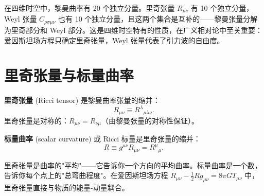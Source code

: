 \begin{remark}[$n=4$ 的特殊性]
在四维时空中，黎曼曲率有 20 个独立分量。里奇张量 $R_{\mu\nu}$ 有 10 个独立分量，Weyl 张量 $C_{\rho\sigma\mu\nu}$ 也有 10 个独立分量，且这两个集合是互补的——黎曼张量分解为里奇部分和 Weyl 部分。这是四维时空特有的性质，在广义相对论中至关重要：爱因斯坦场方程只确定里奇张量，Weyl 张量代表了引力波的自由度。
\end{remark}

\section{里奇张量与标量曲率}

\begin{definition}[里奇张量]
\textbf{里奇张量} (Ricci tensor) 是黎曼曲率张量的缩并：
\begin{equation}
    R_{\mu\nu} \equiv R^\lambda{}_{\mu\lambda\nu}.
\end{equation}
里奇张量是对称的：$R_{\mu\nu} = R_{\nu\mu}$（由黎曼张量的对称性保证）。
\end{definition}

\begin{definition}[标量曲率]
\textbf{标量曲率} (scalar curvature) 或 Ricci 标量是里奇张量的缩并：
\begin{equation}
    R \equiv g^{\mu\nu} R_{\mu\nu} = R^\mu{}_\mu.
\end{equation}
\end{definition}

\begin{note}[物理意义]
里奇张量是曲率的"平均"——它告诉你一个方向的平均曲率。标量曲率是一个数，告诉你每个点上的"总弯曲程度"。在爱因斯坦场方程 $R_{\mu\nu} - \frac{1}{2}R g_{\mu\nu} = 8\pi G T_{\mu\nu}$ 中，里奇张量直接与物质的能量-动量耦合。
\end{note}

